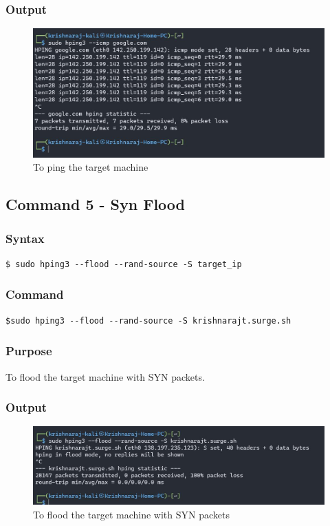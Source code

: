 \documentclass[11pt]{article}
\begin{document}
\subsubsection*{Output}
\begin{figure}[H]
    \centering
    \includegraphics[width=1.0\textwidth]{hping/hping ping.jpg}
    \caption{To ping the target machine}
    \label{fig:4}
\end{figure}

\subsection{Command 5 - Syn Flood}

\subsubsection*{Syntax}
\begin{verbatim}
$ sudo hping3 --flood --rand-source -S target_ip
\end{verbatim}

\subsubsection*{Command}
\begin{verbatim}
$sudo hping3 --flood --rand-source -S krishnarajt.surge.sh
\end{verbatim}

\subsubsection*{Purpose}
To flood the target machine with SYN packets.

\subsubsection*{Output}
\begin{figure}[H]
    \centering
    \includegraphics[width=1.0\textwidth]{hping/hping syn flood.jpg}
    \caption{To flood the target machine with SYN packets}
    \label{fig:5}

\end{figure}
\end{document}
